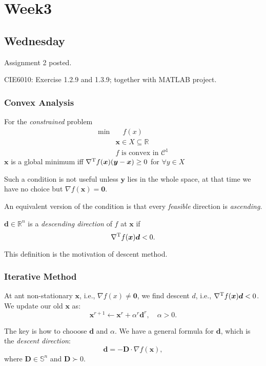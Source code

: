 
\chapter{Week3}

\section{Wednesday}
Assignment 2 posted.

CIE6010: Exercise 1.2.9 and 1.3.9; together with MATLAB project.

\subsection{Convex Analysis}
For the \emph{constrained} problem
\[
\begin{array}{ll}
\min&\quad f(x)\\
&\bm x\in X\subseteq\mathbb{R}\\
&f\mbox{ is convex in }\mathcal{C}^1
\end{array}
\]
$\bm x$ is a global minimum iff $\nabla^{\mathrm T} f(\bm x)(\bm y - \bm x)\ge0$ for $\forall y\in X$

Such a condition is not useful unless $\bm y$ lies in the whole space, at that time we have no choice but $\nabla f(\bm x)=\bm0$.

An equivalent version of the condition is that every \emph{feasible} direction is \emph{ascending}.

\begin{definition}
$\bm d\in\mathbb{R}^n$ is a \emph{descending direction} of $f$ at $\bm x$ if
\[
\nabla^{\mathrm T} f(\bm x)\bm d<0.
\]
\end{definition}
This definition is the motivation of descent method.

\subsection{Iterative Method}
\begin{definition}
At ant non-stationary $\bm x$, i.e., $\nabla f(x)\ne\bm0$, we find descent $d$, i.e., $\nabla^{\mathrm T} f(\bm x)\bm d<0$. We update our old $\bm x$ as:
\[
\bm x^{r+1}\leftarrow \bm x^r+\alpha^r\bm d^r,\quad \alpha>0.
\]
\end{definition}
The key is how to chooose $\bm d$ and $\alpha$. We have a general formula for $\bm d$, which is the \emph{descent direction}:
\[
\bm d = -\bm D\cdot\nabla f(\bm x),
\]
where $\bm D\in\mathbb{S}^n$ and $\bm D\succ0$.

